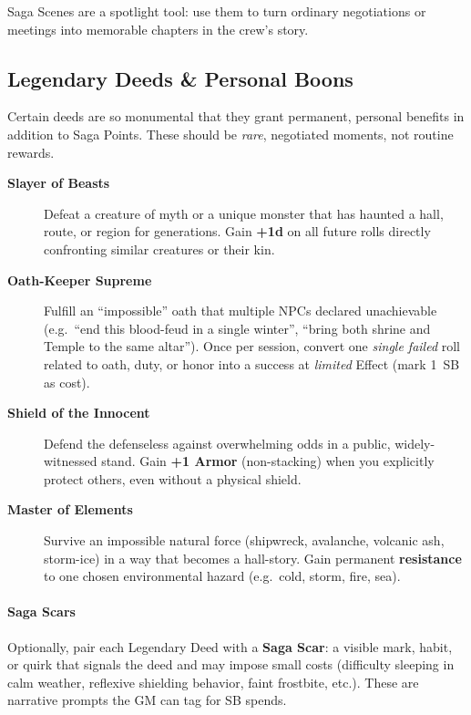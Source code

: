 \documentclass[11pt]{article}
\begin{document}
Saga Scenes are a spotlight tool: use them to turn ordinary negotiations or meetings into
memorable chapters in the crew's story.

\subsection{Legendary Deeds \& Personal Boons}
\label{sec:legendary-deeds}

Certain deeds are so monumental that they grant permanent, personal benefits in addition to Saga
Points. These should be \emph{rare}, negotiated moments, not routine rewards.

\begin{description}
  \item[\textbf{Slayer of Beasts}] Defeat a creature of myth or a unique monster that has haunted
    a hall, route, or region for generations. Gain \textbf{+1d} on all future rolls directly
    confronting similar creatures or their kin.
  \item[\textbf{Oath-Keeper Supreme}] Fulfill an ``impossible'' oath that multiple NPCs declared
    unachievable (e.g.\ ``end this blood-feud in a single winter'', ``bring both shrine and Temple
    to the same altar''). Once per session, convert one \emph{single failed} roll related to oath,
    duty, or honor into a success at \emph{limited} Effect (mark 1~SB as cost).
  \item[\textbf{Shield of the Innocent}] Defend the defenseless against overwhelming odds in a
    public, widely-witnessed stand. Gain \textbf{+1 Armor} (non-stacking) when you explicitly
    protect others, even without a physical shield.
  \item[\textbf{Master of Elements}] Survive an impossible natural force (shipwreck, avalanche,
    volcanic ash, storm-ice) in a way that becomes a hall-story. Gain permanent \textbf{resistance}
    to one chosen environmental hazard (e.g.\ cold, storm, fire, sea).
\end{description}

\paragraph*{Saga Scars}
Optionally, pair each Legendary Deed with a \textbf{Saga Scar}: a visible mark, habit, or quirk
that signals the deed and may impose small costs (difficulty sleeping in calm weather, reflexive
shielding behavior, faint frostbite, etc.). These are narrative prompts the GM can tag for SB
spends.
\end{document}
